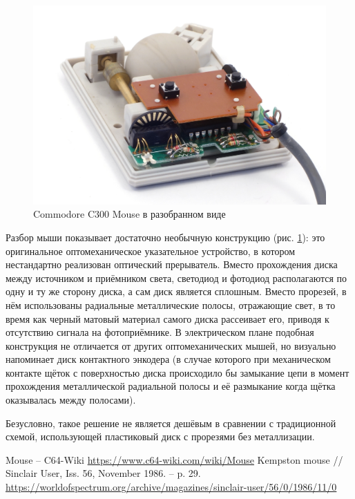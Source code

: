 \documentclass[11pt, a4paper]{article}
\begin{document}
\begin{figure}[h]
    \centering
    \includegraphics[scale=0.7]{1986_commodore_c300_mouse/cm4raz_30.jpg}
    \caption{Commodore C300 Mouse в разобранном виде}
    \label{fig:C300Inside}
\end{figure}

Разбор мыши показывает достаточно необычную конструкцию (рис. \ref{fig:C300Inside}): это оригинальное оптомеханическое указательное устройство, в котором нестандартно реализован оптический прерыватель. Вместо прохождения диска между источником и приёмником света, светодиод и фотодиод располагаются по одну и ту же сторону диска, а сам диск является сплошным. Вместо прорезей, в нём использованы радиальные металлические полосы, отражающие свет, в то время как черный матовый материал самого диска рассеивает его, приводя к отсутствию сигнала на фотоприёмнике. В электрическом плане подобная конструкция не отличается от других оптомеханических мышей, но визуально напоминает диск контактного энкодера (в случае которого при механическом контакте щёток с поверхностью диска происходило бы замыкание цепи в момент прохождения металлической радиальной полосы и её размыкание когда щётка оказывалась между полосами).

Безусловно, такое решение не является дешёвым в сравнении с традиционной схемой, использующей пластиковый диск с прорезями без металлизации.

\begin{thebibliography}{9}
 Mouse -- C64-Wiki \url{https://www.c64-wiki.com/wiki/Mouse}
 Kempston mouse // Sinclair User, Iss. 56, November 1986. -- p. 29. \url{https://worldofspectrum.org/archive/magazines/sinclair-user/56/0/1986/11/0}
\end{thebibliography}
\end{document}
